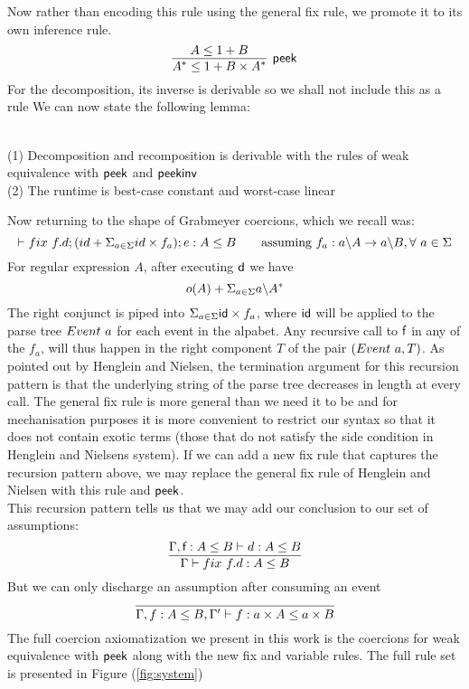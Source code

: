 \documentclass[a4paper,UKenglish,cleveref, autoref, thm-restate]{lipics-v2021}
\begin{document}
Now rather than encoding this rule using the general fix rule, we promote it to its own inference rule.  
\[ \infer[\dslcom{peek}]{A^* \leq 1 + B \times A^*}{A \leq 1 + B} \]
For the decomposition, its inverse is derivable so we shall not include this as a rule 
We can now state the following lemma:
\begin{lemma}
\noindent \\
(1) Decomposition and recomposition is derivable with the rules of weak equivalence with $\textsf{peek}$ and $\textsf{peekinv}$\\
(2) The runtime is best-case constant and worst-case linear
\end{lemma}
Now returning to the shape of Grabmeyer coercions, which we recall was:
\[
\contains{}{\fix ~f.d;(id + \Sigma_{a \in \Sigma} id\times f_a); e}{A}{B} \qquad \text{assuming }f_a : \derive{a}{A} \rightarrow \derive{a}{B}, \forall ~ a \in \Sigma \]
For regular expression $A$, after executing $\textsf{d}$ we have 
\[ o(A) + \Sigma_{a \in \Sigma} a \backslash A^* \]
The right conjunct is piped into $\Sigma_{a \in \Sigma} \textsf{id}\times f_a$, where $\textsf{id}$ will be applied to the parse tree $\event{a}$ for each event in the alpabet. Any recursive call to $\textsf{f}$ in any of the $f_a$, will thus happen in the right component $T$ of the pair $(\event{a},T)$. As pointed out by Henglein and Nielsen, the termination argument for this recursion pattern is that the underlying string of the parse tree decreases in length at every call. The general fix rule is more general than we need it to be and for mechanisation purposes it is more convenient to restrict our syntax so that it does not contain exotic terms (those that do not satisfy the side condition in Henglein and Nielsens system).
If we can add a new fix rule that captures the recursion pattern above, we may replace the general fix rule of Henglein and Nielsen with this rule and $\textsf{peek}$.\\
This recursion pattern tells us that we may add our conclusion to our set of assumptions:
\[\infer{\contains{\Gamma}{\fix ~f.d}{A}{B}}{ \contains{\Gamma, \dslcom{f}: A \leq B}{d}{A}{B}}
\]
But we can only discharge an assumption after consuming an event
\[\infer{\contains{\Gamma, f : A \leq B, \Gamma'}{f}{a \times A}{a \times B}}{}
\]
The full coercion axiomatization we present in this work is the coercions for weak equivalence with $\textsf{peek}$ along with the new fix and variable rules. The full rule set is presented in Figure (\ref{fig:system})
\end{document}
